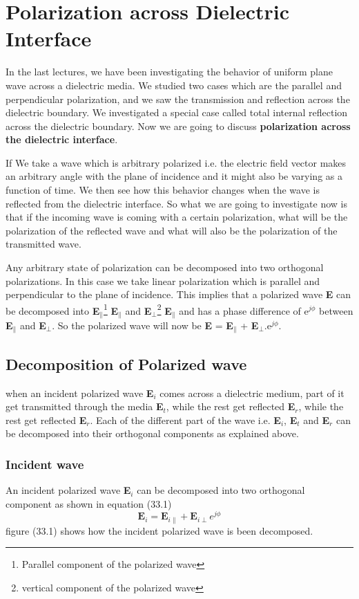 \chapter{Polarization across Dielectric Interface}
In the last lectures, we have been investigating the behavior of uniform plane wave across a dielectric media. We studied two cases which are the parallel and perpendicular polarization, and we saw the transmission and reflection across the dielectric boundary. We investigated a special case called total internal reflection across the dielectric boundary. Now we are going to discuss \textbf{polarization across the dielectric interface}. 

If We take a wave which is arbitrary polarized i.e. the electric field vector makes an arbitrary angle with the plane of incidence and it might also be varying as a function of time. We then see how this behavior changes when the wave is reflected from the dielectric interface. So what we are going to investigate now is that if the incoming wave is coming with a certain polarization, what will be the polarization of the reflected wave and what will also be the polarization of the transmitted wave.

Any arbitrary state of polarization can be decomposed into two orthogonal polarizations. In this case we take linear polarization which is parallel and perpendicular to the plane of incidence. This implies that a polarized wave \textbf{E} can be decomposed into \textbf{E}$_\parallel$\footnote{Parallel component of the polarized wave} \textbf{E}$_\parallel$ and \textbf{E}$_\perp$\footnote{vertical component of the polarized wave} \textbf{E}$_\parallel$ and has a phase difference of e$^{j\phi}$ between \textbf{E}$_\parallel$ and \textbf{E}$_\perp$. So the polarized wave will now be \textbf{E} = \textbf{E}$_\parallel$ + \textbf{E}$_\perp$.e$^{j\phi}$.	
\section{Decomposition of Polarized wave}	
when an incident polarized wave \textbf{E$_i$} comes across a dielectric medium, part of it get transmitted through the media \textbf{E$_t$}, while the rest get reflected \textbf{E$_r$}, while the rest get reflected \textbf{E$_r$}. Each of the different part of the wave i.e. \textbf{E$_i$}, \textbf{E$_t$} and \textbf{E$_r$} can be decomposed into their orthogonal components as explained above.	
\subsection{Incident wave}	
An incident polarized wave \textbf{E$_i$} can be decomposed into two orthogonal component as shown in equation (33.1)	
\begin{equation}
\textbf{E}_i = \textbf{E}_{i\parallel} + \textbf{E}_{i\perp} e^{j\phi}
\end{equation}
figure (33.1) shows how the incident polarized wave is been decomposed.	
